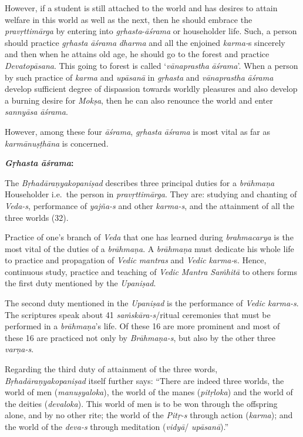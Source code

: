 However, if a student is still attached to the world and has desires to attain welfare in this world as well as the next, then he should embrace the \emph{pravṛttimārga} by entering into \emph{gṛhasta}-\emph{āśrama} or householder life. Such, a person should practice \emph{gṛhasta} \emph{āśrama} \emph{dharma} and all the enjoined \emph{karma-}s sincerely and then when he attains old age, he should go to the forest and practice \emph{Devatopāsana}. This going to forest is called `\emph{vānaprastha} \emph{āśrama}'. When a person by such practice of \emph{karma} and \emph{upāsanā} in \emph{gṛhasta} and \emph{vānaprastha} \emph{āśrama} develop sufficient degree of dispassion towards worldly pleasures and also develop a burning desire for \emph{Mokṣa}, then he can also renounce the world and enter \emph{sannyāsa} \emph{āśrama}.

However, among these four \emph{āśrama}, \emph{gṛhasta} \emph{āśrama} is most vital as far as \emph{karmānuṣṭhāna} is concerned.
\vskip 5pt

\textbf{\emph{Gṛhasta} \emph{āśrama}:}

The \emph{Bṛhadāraṇyakopaniṣad} describes three principal duties for a \emph{brāhmaṇa} Householder i.e.\ the person in \emph{pravṛttimārga}. They are: studying and chanting of \emph{Veda-s}, performance of \emph{yajña-s} and other \emph{karma-s}, and the attainment of all the three worlds (32).

Practice of one's branch of \emph{Veda} that one has learned during \emph{brahmacarya} is the most vital of the duties of a \emph{brāhmaṇa}. A \emph{brāhmaṇa} must dedicate his whole life to practice and propagation of \emph{Vedic} \emph{mantras} and \emph{Vedic} \emph{karma-}s. Hence, continuous study, practice and teaching of \emph{Vedic} \emph{Mantra Saṁhitā} to others forms the first duty mentioned by the \emph{Upaniṣad}.

The second duty mentioned in the \emph{Upaniṣad} is the performance of \emph{Vedic} \emph{karma-s}. The scriptures speak about 41 \emph{saṁskāra-s}/ritual ceremonies that must be performed in a \emph{brāhmaṇa}'s life. Of these 16 are more prominent and most of these 16 are practiced not only by \emph{Brāhmaṇa-s}, but also by the other three \emph{varṇa-s}.

Regarding the third duty of attainment of the three words, \emph{Bṛhadā\-raṇya\-kopaniṣad} itself further says: ``There are indeed three worlds, the world of men (\emph{manuṣyaloka}), the world of the manes (\emph{pitṛloka}) and the world of the deities (\emph{devaloka}). This world of men is to be won through the offspring alone, and by no other rite; the world of the \emph{Pitṛ-s} through action (\emph{karma}); and the world of the \emph{deva-s} through meditation (\emph{vidyā}/ \emph{upāsanā}).''

